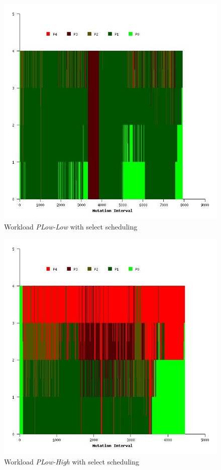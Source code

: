 \begin{figure}
  \begin{center}
    \includegraphics[scale=0.4]{figures/mutation_timeline_figures/mut_sel_t1/PLow-Low/125_4.jpeg}%
    \caption{Workload \textit{PLow-Low} with select  scheduling}
    \label{fig:wrk_plowlow_select}
  \end{center}
\end{figure}

\begin{figure}
  \begin{center}
    \includegraphics[scale=0.4]{figures/mutation_timeline_figures/mut_sel_t1/PLow-High/125_4.jpeg}%
    \caption{Workload \textit{PLow-High} with select scheduling}
    \label{fig:wrk_plowhigh_select}
  \end{center}
\end{figure}

